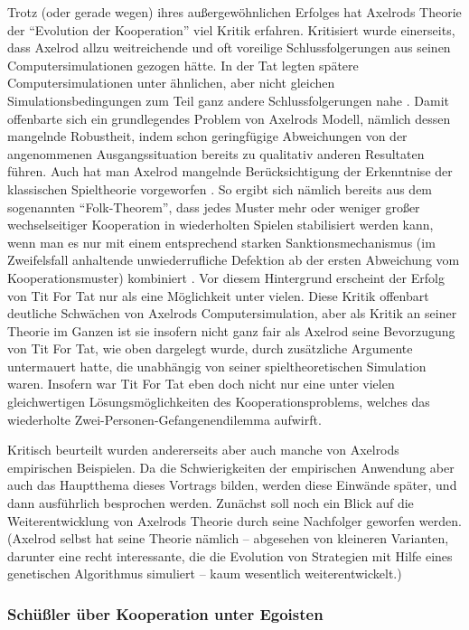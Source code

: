 \documentclass[12pt,a4paper,ngerman]{article}
\begin{document}
Trotz (oder gerade wegen) ihres außergewöhnlichen Erfolges hat Axelrods
Theorie der "`Evolution der Kooperation"' viel Kritik
erfahren. Kritisiert wurde einerseits, dass Axelrod allzu
weitreichende und oft voreilige Schlussfolgerungen aus seinen
Computersimulationen gezogen hätte. In der Tat legten spätere
Computersimulationen unter ähnlichen, aber nicht gleichen
Simulationsbedingungen zum Teil ganz andere Schlussfolgerungen
nahe \cite[S. 313ff.]{binmore:1998}. Damit offenbarte sich ein grundlegendes
Problem von Axelrods Modell, nämlich dessen mangelnde Robustheit, indem schon
geringfügige Abweichungen von der angenommenen Ausgangssituation bereits zu
qualitativ anderen Resultaten führen.  Auch hat man Axelrod mangelnde
Berücksichtigung der Erkenntnise der klassischen Spieltheorie
vorgeworfen \cite[S. 316]{binmore:1998}. So ergibt sich nämlich bereits aus dem
sogenannten "`Folk-Theorem"', dass jedes Muster mehr oder weniger großer
wechselseitiger Kooperation in wiederholten Spielen stabilisiert
werden kann, wenn man es nur mit einem entsprechend starken
Sanktionsmechanismus (im Zweifelsfall anhaltende unwiederrufliche
Defektion ab der ersten Abweichung vom Kooperationsmuster)
kombiniert \cite[S. 293ff.]{binmore:1998}. Vor diesem Hintergrund erscheint der
Erfolg von Tit For Tat nur als eine Möglichkeit unter vielen. Diese Kritik
offenbart deutliche Schwächen von Axelrods Computersimulation, aber als Kritik
an seiner Theorie im Ganzen ist sie insofern nicht ganz fair als
Axelrod seine Bevorzugung von Tit For Tat, wie oben dargelegt wurde,
durch zusätzliche Argumente untermauert hatte, die unabhängig von
seiner spieltheoretischen Simulation waren. Insofern war Tit For Tat
eben doch nicht nur eine unter vielen gleichwertigen
Lösungsmöglichkeiten des Kooperationsproblems, welches das wiederholte
Zwei-Personen-Gefangenendilemma aufwirft. 

Kritisch beurteilt wurden andererseits aber auch manche von Axelrods
empirischen Beispielen. Da die Schwierigkeiten der empirischen
Anwendung aber auch das Hauptthema dieses Vortrags bilden, werden
diese Einwände später, und dann ausführlich besprochen
werden. Zunächst soll noch ein Blick auf die Weiterentwicklung von
Axelrods Theorie durch seine Nachfolger geworfen werden.  (Axelrod
selbst hat seine Theorie nämlich -- abgesehen von kleineren Varianten,
darunter eine recht interessante, die die Evolution von Strategien mit
Hilfe eines genetischen Algorithmus simuliert \cite{axelrod:1997} -- kaum
wesentlich weiterentwickelt.)


\subsubsection{Schüßler über Kooperation unter Egoisten}
\end{document}
